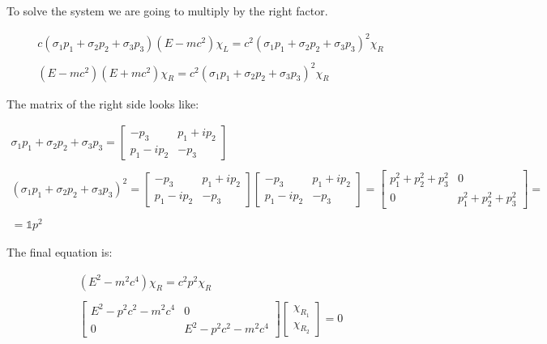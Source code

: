 To solve the system we are going to multiply by the right factor.

\begin{equation}
  \begin{array}{c}
    c(\sigma_1 p_1 + \sigma_2 p_2 + \sigma_3 p_3)(E-mc^2) \chi_L = c^2 (\sigma_1 p_1 + \sigma_2 p_2 + \sigma_3 p_3)^2\chi_R
    \\

    \\
    (E-mc^2)(E+mc^2) \chi_R = c^2 (\sigma_1 p_1 + \sigma_2 p_2 + \sigma_3 p_3)^2\chi_R
  \end{array}
\end{equation}

The matrix of the right side looks like:

\begin{equation}
  \begin{array}{c}
    \sigma_1 p_1 + \sigma_2 p_2 + \sigma_3 p_3 = \begin{bmatrix}
      -p_3 & p_1 + ip_2\\
      p_1 - ip_2 & -p_3
      \end{bmatrix}
    \\

    \\
    (\sigma_1 p_1 + \sigma_2 p_2 + \sigma_3 p_3)^2 = \begin{bmatrix}
    -p_3 & p_1 + ip_2\\
    p_1 - ip_2 & -p_3
    \end{bmatrix}\begin{bmatrix}
    -p_3 & p_1 + ip_2\\
    p_1 - ip_2 & -p_3
    \end{bmatrix} = \begin{bmatrix}
    p_1^2 + p_2^2 + p_3^2 & 0\\
    0 & p_1^2 + p_2^2 + p_3^2
    \end{bmatrix} =
    \\

    \\
    = \mathbb{1} p^2
  \end{array}
\end{equation}

The final equation is:

\begin{equation}
  \begin{array}{c}
    (E^2-m^2c^4)\chi_R = c^2 p^2\chi_R
    \\

    \\
    \begin{bmatrix}
      E^2-p^2c^2-m^2c^4 & 0\\
      0 & E^2-p^2c^2-m^2c^4
    \end{bmatrix}
    \begin{bmatrix}
      \chi_R_1\\
      \chi_R_2
    \end{bmatrix} = 0
  \end{array}
\end{equation}

